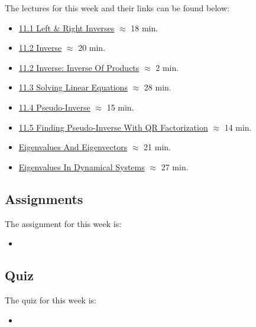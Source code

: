 The lectures for this week and their links can be found below:

\begin{itemize}
    \item \href{https://applied.cs.colorado.edu/mod/hvp/view.php?id=50802}{11.1 Left \& Right Inverses} $\approx$ 18 min.
    \item \href{https://applied.cs.colorado.edu/mod/hvp/view.php?id=50803}{11.2 Inverse} $\approx$ 20 min.
    \item \href{https://applied.cs.colorado.edu/mod/hvp/view.php?id=50804}{11.2 Inverse: Inverse Of Products} $\approx$ 2 min.
    \item \href{https://applied.cs.colorado.edu/mod/hvp/view.php?id=50805}{11.3 Solving Linear Equations} $\approx$ 28 min.
    \item \href{https://applied.cs.colorado.edu/mod/hvp/view.php?id=50806}{11.4 Pseudo-Inverse} $\approx$ 15 min.
    \item \href{https://applied.cs.colorado.edu/mod/hvp/view.php?id=50807}{11.5 Finding Pseudo-Inverse With QR Factorization} $\approx$ 14 min.
    \item \href{https://applied.cs.colorado.edu/mod/hvp/view.php?id=50808}{Eigenvalues And Eigenvectors} $\approx$ 21 min.
    \item \href{https://applied.cs.colorado.edu/mod/hvp/view.php?id=50809}{Eigenvalues In Dynamical Systems} $\approx$ 27 min.
\end{itemize}

\subsection{Assignments}

The assignment for this week is:

\begin{itemize}
    \item {}
\end{itemize}

\subsection{Quiz}

The quiz for this week is:

\begin{itemize}
    \item {}
\end{itemize}

